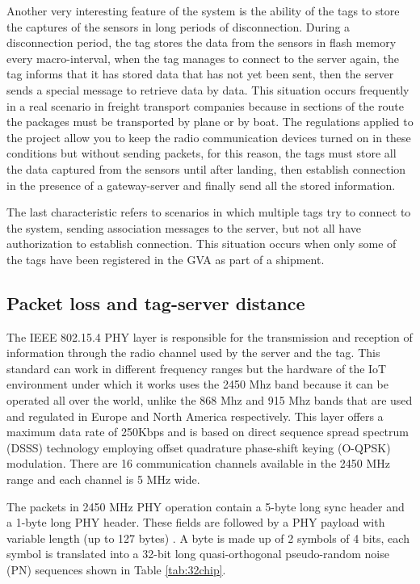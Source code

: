 \documentclass[journal]{IEEEtran}	%
\begin{document}
Another very interesting feature of the system is the ability of the tags to store the captures of the sensors in long periods of disconnection. During a disconnection period, the tag stores the data from the sensors in flash memory every macro-interval, when the tag manages to connect to the server again, the tag informs that it has stored data that has not yet been sent, then the server sends a special message to retrieve data by data. This situation occurs frequently in a real scenario in freight transport companies because in sections of the route the packages must be transported by plane or by boat. The regulations applied to the project allow you to keep the radio communication devices turned on in these conditions but without sending packets, for this reason, the tags must store all the data captured from the sensors until after landing, then establish connection in the presence of a gateway-server and finally send all the stored information.

The last characteristic refers to scenarios in which multiple tags try to connect to the system, sending association messages to the server, but not all have authorization to establish connection. This situation occurs when only some of the tags have been registered in the GVA as part of a shipment.

\subsection{Packet loss and tag-server distance}

The IEEE 802.15.4 PHY layer is responsible for the transmission and reception of information through the radio channel used by the server and the tag. This standard can work in different frequency ranges but the hardware of the IoT environment under which it works uses the 2450 Mhz band because it can be operated all over the world, unlike the 868 Mhz and 915 Mhz bands that are used and regulated in Europe and North America respectively. This layer offers a maximum data rate of 250Kbps and is based on direct sequence spread spectrum (DSSS) technology employing offset quadrature phase-shift keying (O-QPSK) modulation. There are 16 communication channels available in the 2450 MHz range and each channel is 5 MHz wide.

The packets in 2450 MHz PHY operation contain a 5-byte long sync header and a 1-byte long PHY header. These fields are followed by a PHY payload with variable length (up to 127 bytes) \cite{ieee154}. A byte is made up of 2 symbols of 4 bits, each symbol is translated into a 32-bit long quasi-orthogonal pseudo-random noise (PN) sequences shown in Table \ref{tab:32chip}.
\end{document}
